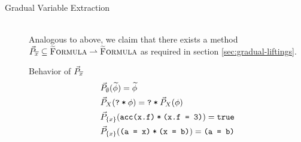 \begin{description}
\begin{comment}
    
    \begin{lemma}~\\
        Let $\dgrad{P}_{\phi_t} : \setGFormula \rightharpoonup \setGFormula$ be defined as
        \begin{alignat*}{2}
        & \dgrad{P}_{\phi_t}(\phi_1)          & &= \underset{\phiImplies{}{}}{\min} \{~ \phi_2 \in \setFormulaB ~|~ \phiImplies{\phi_1}{\phiCons{$\phi_t$}{$\phi_2$}} ~\} \\
        & \dgrad{P}_{\phi_t}(\withqm{\phi_1}) & &= \withqm{\dgrad{P}_{\phi_t}(\phi_1)}
        \end{alignat*}
        Then $\dgrad{P}_{\phi_t}$ is well-defined and an optimal deterministic lifting of $P_{\phi_t}$.
    \end{lemma}
    We extend the domain of $\wo{}{}$ to deal with gradual parameters:
    \begin{displaymath}
    \wo{\grad{\phi}}{(\withqm{\phi_t})} ~\defeq~ \wo{\grad{\phi}}{\static{$\grad{\phi}$}}
    \end{displaymath}
    Formally, this extension optimally lifts the function w.r.t. its second parameter.
    
    \end{comment}
    
    \item[Gradual Variable Extraction]~\\
    Analogous to above, we claim that there exists a method $\vec{P}_{\overline{x}} \subseteq \textup{\textsc{\ensuremath{\widetilde{\text{F}}}ormula}} \rightharpoonup \textup{\textsc{\ensuremath{\widetilde{\text{F}}}ormula}}$ as required in section \ref{sec:gradual-liftings}.
    
    \begin{example}{Behavior of $\vec{P}_{\overline{x}}$}
        \begin{align*}
        &\vec{P}_{\emptyset}(\widetilde{\phi}) = \widetilde{\phi}\\
        &\vec{P}_{X}(\textup{\texttt{\textup{\texttt{?}}\:*\:\ensuremath{\phi}}}) = \textup{\texttt{\textup{\texttt{?}}\:*\:\ensuremath{\vec{P}_{X}(\phi)}}}\\
        &\vec{P}_{\{x\}}(\textup{\texttt{acc(x.f)\:*\:(x.f = 3)}}) = \textup{\texttt{true}}\\
        &\vec{P}_{\{x\}}(\textup{\texttt{(a = x)\:*\:(x = b)}}) = \textup{\texttt{(a = b)}}
        \end{align*}
    \end{example}
\end{description}